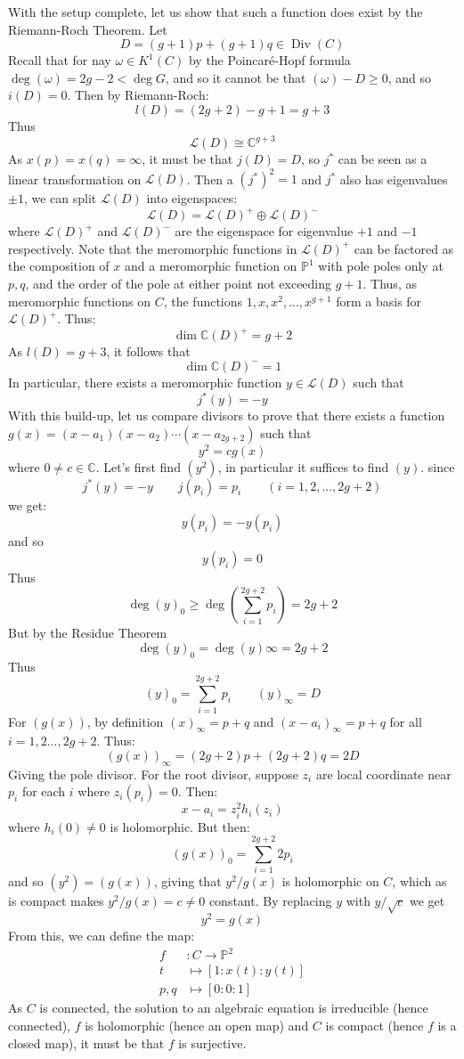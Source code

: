 \documentclass{book}
\newcommand{\C}{{\mathbb{C}}}
\renewcommand{\P}{{\mathbb{P}}}
\newcommand{\CL}{{\mathcal{L}}}
\newcommand{\Div}{{\operatorname{Div}}}
\begin{document}
\begin{Proof}
  With the setup complete, let us show that such a function does exist by the Riemann-Roch Theorem. Let
  \[
    D = (g+1)p + (g+1)q \in \Div(C)
  \]
  Recall that for nay $\omega \in K^1(C)$ by the Poincar\'e-Hopf formula $\deg(\omega) = 2g-2 < \deg G$, and
  so it cannot be that $(\omega) - D \ge 0$, and so $i(D) = 0$. Then by Riemann-Roch:
  \[
    l(D) = (2g+2)-g+1 = g+3
  \]
  Thus
  \[
    \CL(D) \cong \C^{g+3}
  \]
  As $x(p) = x(q) = \infty$, it must be that $j(D) = D$, so $j^*$ can be seen as a linear transformation on
  $\CL(D)$. Then a $(j^*)^2 = 1$ and $j^*$ also has eigenvalues $\pm 1$, we can split $\CL(D)$ into
  eigenspaces:
  \[
      \CL(D) = \CL(D)^+ \oplus \CL(D)^-
  \]
  where $\CL(D)^+$ and $\CL(D)^-$ are the eigenspace for eigenvalue $+1$ and $-1$ respectively. Note that the
  meromorphic functions in $\CL(D)^+$ can be factored as the composition of $x$ and a meromorphic function on
  $\P^1$ with pole poles only at $p,q$, and the order of the pole at either point not exceeding $g+1$. Thus,
  as meromorphic functions on $C$, the functions $1,x,x^2, ..., x^{g+1}$ form a basis for $\CL(D)^+$. Thus:
  \[
    \dim \C(D)^+ = g+2
  \]
  As $l(D) = g+3$, it follows that
  \[
    \dim \C(D)^- = 1
  \]
  In particular, there exists a meromorphic function $y \in \CL(D)$ such that
  \[
    j^*(y) = -y
  \]
  With this build-up, let us compare divisors to prove that there exists a function $g(x) =
  (x-a_1)(x-a_2)\cdots (x-a_{2g+2})$ such that
  \[
    y^2 = cg(x)
  \]
  where $0\ne c \in \C$. Let's first find $(y^2)$, in particular it suffices to find $(y)$. since
  \[
    j^*(y) = -y \qquad j(p_i) = p_i \qquad (i = 1,2,...,2g+2)
  \]
  we get:
  \[
    y(p_i) = -y(p_i)
  \]
  and so
  \[
    y(p_i) = 0
  \]
  Thus
  \[
    \deg(y)_0 \ge \deg \left(\sum_{i=1}^{2g+2}p_i\right) = 2g+2
  \]
  But by the Residue Theorem
  \[
    \deg(y)_0 = \deg(y)\infty = 2g+2
  \]
  Thus
  \[
    (y)_0 = \sum_{i=1}^{2g+2} p_i \qquad (y)_\infty = D
  \]
  For $(g(x))$, by definition $(x)_\infty = p+q$ and $(x-a_i)_{\infty} = p+q$ for all $i = 1,2..., 2g+2$.
  Thus:
  \[
    (g(x))_\infty = (2g+2)p + (2g+2)q = 2D
  \]
  Giving the pole divisor. For the root divisor, suppose $z_i$ are local coordinate near $p_i$ for each $i$
  where $z_i(p_i) = 0$. Then:
  \[
    x-a_i = z_i^2h_i(z_i)
  \]
  where $h_i(0) \ne 0$ is holomorphic. But then:
  \[
  (g(x))_0 = \sum_{i=1}^{2g+2}2p_i
  \]
  and so $(y^2) = (g(x))$, giving that $y^2/g(x)$ is holomorphic on $C$, which as is compact makes $y^2/g(x)
  = c\ne 0$ constant. By replacing $y$ with $y/\sqrt{c}$ we get
    \[
      y^2 = g(x)
    \]
    From this, we can define the map:
    \begin{align*}
      f&: C \to \P^2\\
      t &\mapsto [1: x(t): y(t)]\\
      p,q &\mapsto [0:0:1]
    \end{align*}
    As $C$ is connected, the solution to an algebraic equation is irreducible (hence connected), $f$ is
    holomorphic (hence an open map) and $C$ is compact (hence $f$ is a closed map), it must be that $f$ is
    surjective.


\end{Proof}
\end{document}
